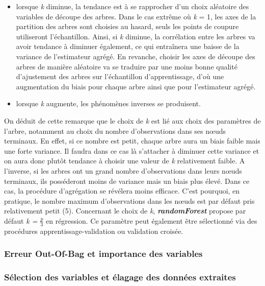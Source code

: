 	\begin{itemize}
	\item lorsque \textit{k} diminue, la tendance est à se rapprocher d’un choix aléatoire des variables
	de découpe des arbres. Dans le cas extrême où \textit{k} = 1, les axes de la partition des arbres
	sont choisies au hasard, seuls les points de coupure utiliseront l’échantillon. Ainsi, si \textit{k}
	diminue, la corrélation entre les arbres va avoir tendance à diminuer également, ce qui
	entraînera une baisse de la variance de l’estimateur agrégé. En revanche, choisir les axes
	de découpe des arbres de manière aléatoire va se traduire par une moins bonne
	qualité d’ajustement des arbres sur l’échantillon d’apprentissage, d’où une augmentation
	du biais pour chaque arbre ainsi que pour l’estimateur agrégé.
	\item lorsque \textit{k} augmente, les phénomènes inverses se produisent.
	\end{itemize}
	On déduit de cette remarque que le choix de \textit{k} est lié aux choix des paramètres de l’arbre,
	notamment au choix du nombre d’observations dans ses nœuds terminaux. En effet, si ce
	nombre est petit, chaque arbre aura un biais faible mais une forte variance. Il faudra dans ce cas là s’attacher à diminuer cette variance et on aura donc plutôt tendance à choisir une
	valeur de \textit{k} relativement faible. A l’inverse, si les arbres ont un grand nombre d’observations
	dans leurs nœuds terminaux, ils posséderont moins de variance mais un biais plus élevé. Dans
	ce cas, la procédure d’agrégation se révélera moins efficace. C’est pourquoi, en pratique, le
	nombre maximum d’observations dans les nœuds est par défaut pris relativement petit (5). Concernant le choix de \textit{k}, \textit{\textbf{randomForest}} propose par
	défaut \textit{k = $\frac{p}{3}$} en régression. Ce paramètre peut également
	être sélectionné via des procédures apprentissage-validation ou validation croisée.
	\subsubsection{Erreur Out-Of-Bag et importance des variables}
	\subsubsection{Sélection des variables et élagage des données extraites}